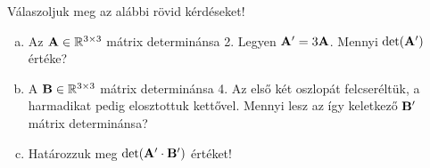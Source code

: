 \begin{exercise}{Válaszoljuk meg az alábbi rövid kérdéseket!}
  \begin{enumerate}[a)]
    \item Az $\mathbf{A} \in \mathbb R^{3 \times 3}$ mátrix determinánsa 2.
          Legyen $\mathbf{A}' = 3 \mathbf{A}$.
          Mennyi $\det(\mathbf{A}')$ értéke?
    \item A $\mathbf{B} \in \mathbb R^{3 \times 3}$ mátrix determinánsa 4.
          Az első két oszlopát felcseréltük, a harmadikat pedig
          elosztottuk kettővel. Mennyi lesz az így keletkező $\mathbf{B}'$ mátrix
          determinánsa?
    \item Határozzuk meg $\det(\mathbf{A}' \cdot \mathbf{B}')$ értéket!
  \end{enumerate}

\end{exercise}
